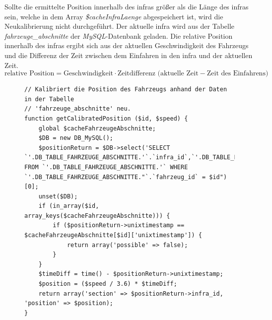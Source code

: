 Sollte die ermittelte Position innerhalb des \ac{infra}s größer als die Länge des \ac{infra}s sein, welche in dem Array \textit{\$cacheInfraLaenge} abgespeichert ist, wird die Neukalibrierung nicht durchgeführt. Der aktuelle \ac{infra} wird aus der Tabelle \textit{fahrzeuge\_abschnitte} der \textit{MySQL}-Datenbank geladen. Die relative Position innerhalb des \ac{infra}s ergibt sich aus der aktuellen Geschwindigkeit des Fahrzeugs und die Differenz der Zeit zwischen dem Einfahren in den \ac{infra} und der aktuellen Zeit.
\begin{equation*}
\textrm{relative Position} = \textrm{Geschwindigkeit} \cdot \textrm{Zeitdifferenz (aktuelle Zeit} - \textrm{Zeit des Einfahrens)}
\end{equation*}
\begin{figure}
\begin{lstlisting}[caption={\textit{getCalibratedPosition$($$)$} (\textit{functions\_db.php})},captionpos=b,label={lst:getCalibratedPosition}]
// Kalibriert die Position des Fahrzeugs anhand der Daten in der Tabelle
// 'fahrzeuge_abschnitte' neu.
function getCalibratedPosition ($id, $speed) {
	global $cacheFahrzeugeAbschnitte;
	$DB = new DB_MySQL();
	$positionReturn = $DB->select('SELECT `'.DB_TABLE_FAHRZEUGE_ABSCHNITTE.'`.`infra_id`,`'.DB_TABLE_FAHRZEUGE_ABSCHNITTE.'`.`unixtimestamp` FROM `'.DB_TABLE_FAHRZEUGE_ABSCHNITTE.'` WHERE `'.DB_TABLE_FAHRZEUGE_ABSCHNITTE."`.`fahrzeug_id` = $id")[0];
	unset($DB);
	if (in_array($id, array_keys($cacheFahrzeugeAbschnitte))) {
		if ($positionReturn->unixtimestamp == $cacheFahrzeugeAbschnitte[$id]['unixtimestamp']) {
			return array('possible' => false);
		}
	}
	$timeDiff = time() - $positionReturn->unixtimestamp;
	$position = ($speed / 3.6) * $timeDiff;
	return array('section' => $positionReturn->infra_id, 'position' => $position);
}
\end{lstlisting}
\end{figure}

